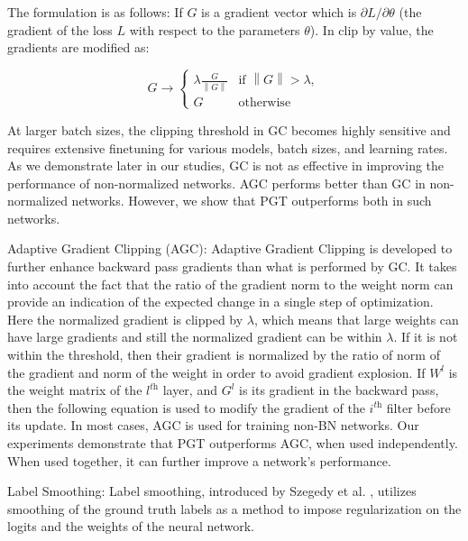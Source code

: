 \documentclass[times,sort&compress]{elsarticle}
\newcommand{\norm}[1]{\left\lVert#1\right\rVert}
\begin{document}
The formulation is as follows: If $G$ is a gradient vector which is $\partial
L / \partial \theta$ (the gradient of the loss $L$ with respect to
the parameters $\theta$). In clip by value, the gradients are modified as:



\begin{equation}
G \rightarrow
\begin{cases}
\lambda \frac{G}{\norm{G}} & \text{if } \norm{G} > \lambda, \\
G & \text{otherwise}
\end{cases}
\end{equation}



At larger batch sizes, the clipping threshold in GC becomes highly sensitive and
requires extensive finetuning for various models, batch sizes, and learning rates. As we
demonstrate later in our studies, GC is not as effective in improving the performance of
non-normalized networks. AGC performs better than GC in non-normalized networks.
However, we show that PGT outperforms both in such networks.




Adaptive Gradient Clipping (AGC): Adaptive Gradient Clipping \cite{brock2021high} is
developed to further enhance backward pass gradients than what is performed by GC. It
takes into account the fact that the ratio of the gradient norm to the weight norm can
provide an indication of the expected change in a single step of optimization. Here the
normalized gradient is clipped by $\lambda$, which means that large weights can have
large gradients and still the normalized gradient can be within $\lambda$. If it is not
within the threshold, then their gradient is normalized by the ratio of norm of the
gradient and norm of the weight in order to avoid gradient explosion. If $W^l$ is the
weight matrix of the $l^\textit{th}$ layer, and $G^l$ is its gradient in the backward
pass, then the following equation is used to modify the gradient of the $i^\textit{th}$
filter before its update. In most cases, AGC is used for training non-BN networks. Our
experiments demonstrate that PGT outperforms AGC, when used independently. When used
together, it can further improve a network's performance.








Label Smoothing: Label smoothing, introduced by Szegedy et al.
\cite{szegedy2016rethinking}, utilizes smoothing of the ground truth labels as a method
to impose regularization on the logits and the weights of the neural network.
\end{document}
